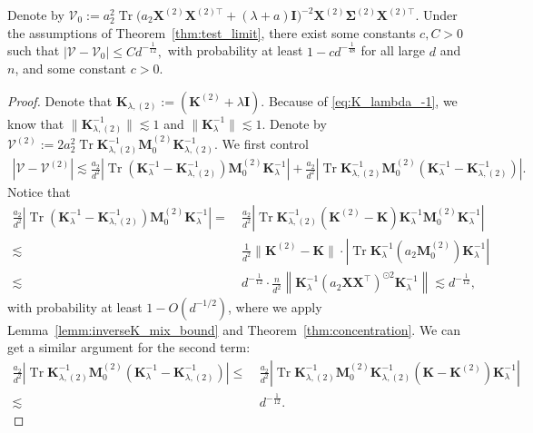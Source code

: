 \documentclass[twoside,11pt]{article}
\newcommand{\norm}[1]{\left\|#1\right\|}
\def\bI{{\mathbf I}}
\def\bK{{\boldsymbol K}}
\def\bX{{\boldsymbol X}}
\def\bM{{\boldsymbol M}}
\def\bSigma{{\boldsymbol \Sigma}}
\def\cV{{\mathcal V}}
\def\cV{{\mathcal V}}
\renewcommand{\bK}{\boldsymbol{K}}
\newcommand{\Tr}{\operatorname{Tr}}
\newcommand{\1}{\mathbf{1}}
\begin{document}
\begin{lemma}\label{lemm:approx_variance}
Denote by
$\cV_0:= a_2^2\Tr\big(a_2\bX^{(2)}\bX^{(2)\top}+(\lambda+a )\bI\big)^{-2}  {\bX}^{(2)}\bSigma^{(2)} {\bX}^{(2)\top}$.  
Under the assumptions of Theorem~\ref{thm:test_limit}, there exist some constants $c,C>0$ such that 
$ 
    \left|\cV-\cV_0\right|\le C d^{-\frac{1}{12}},
$
with probability at least $1-cd^{-\frac{1}{48}}$ for all large $d$ and $n$, and some constant $c>0$.
\end{lemma}
\begin{proof}
Denote that $\bK _{\lambda,(2)}:= (\bK^{(2)}+\lambda\bI) $. Because of \eqref{eq:K_lambda_-1}, we know that $\|\bK _{\lambda,(2)}^{-1}\|\lesssim 1$ and $ \|\bK _{\lambda}^{-1}\|\lesssim 1$. Denote by $\cV^{(2)}:=  2a_2^2\Tr\bK _{\lambda,(2)}^{-1} \bM_0^{(2)} \bK _{\lambda,(2)}^{-1}$. We first control
\begin{align}
    \left|\cV-\cV^{(2)}\right|\lesssim  \frac{a_2}{d^2}|\Tr(\bK_{\lambda}^{-1}- \bK^{-1}_{\lambda,(2)})\bM_0^{(2)} \bK_{\lambda}^{-1} |+\frac{a_2}{d^2}|\Tr \bK^{-1}_{\lambda,(2)}\bM_0^{(2)} (\bK_{\lambda}^{-1}- \bK^{-1}_{\lambda,(2)})|.\label{eq:V-V(2)1}
\end{align}
Notice that
\begin{align}
    \frac{a_2}{d^2}|\Tr(\bK_{\lambda}^{-1}- \bK^{-1}_{\lambda,(2)})\bM_0^{(2)} \bK_{\lambda}^{-1} |=~&\frac{a_2}{d^2}|\Tr\bK^{-1}_{\lambda,(2)}(\bK^{(2)}-\bK)\bK_{\lambda}^{-1}\bM_0^{(2)} \bK_{\lambda}^{-1} |\\
    \lesssim~& \frac{1}{d^2}\|\bK^{(2)}-\bK\|\cdot |\Tr \bK_{\lambda}^{-1}(a_2\bM_0^{(2)}) \bK_{\lambda}^{-1} |\\
    \lesssim~& d^{-\frac{1}{12}}\cdot \frac{n}{d^2}\norm{\bK_{\lambda}^{-1}(a_2\bX\bX^\top)^{\odot 2} \bK_{\lambda}^{-1}}\lesssim d^{-\frac{1}{12}},\label{eq:V-V(2)2}
\end{align}
with probability at least $1-O(d^{-1/2})$, where we apply Lemma~\ref{lemm:inverseK_mix_bound}  and 
 Theorem~\ref{thm:concentration}. We can get a similar argument for the second term:
 \begin{align}
     \frac{a_2}{d^2}|\Tr \bK^{-1}_{\lambda,(2)}\bM_0^{(2)} (\bK_{\lambda}^{-1}- \bK^{-1}_{\lambda,(2)})|\le ~& \frac{a_2}{d^2}|\Tr \bK^{-1}_{\lambda,(2)}\bM_0^{(2)} \bK^{-1}_{\lambda,(2)}(\bK - \bK^{(2)})\bK_{\lambda}^{-1}|\\
     \lesssim~& d^{-\frac{1}{12}}.\label{eq:V-V(2)3}
 \end{align}


\end{proof}
\end{document}

